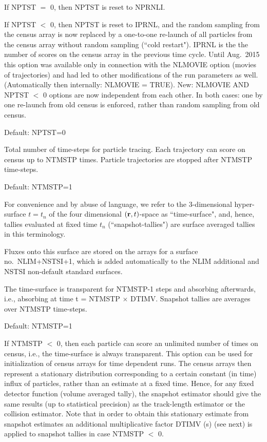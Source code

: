 \begin{description}
        If NPTST $=$ 0, then NPTST is reset to NPRNLI.

        If NPTST $<$ 0, then NPTST is reset to IPRNL, and the random sampling from the
        census array is now replaced by a one-to-one re-launch of all particles from
        the census array without random sampling (``cold restart").
        IPRNL is the the number of scores on the census array in the previous time
        cycle.
        Until Aug.\ 2015 this option was available only in connection with the NLMOVIE
        option (movies of trajectories) and had led to other modifications of the run
        parameters as well.
        (Automatically then internally: NLMOVIE = TRUE).
        New: NLMOVIE AND NPTST $<$ 0 options are now independent from each other.
        In both cases: one by one re-launch from old census is enforced, rather than
        random sampling from old census.

        Default: NPTST=0
  \item[NTMSTP] Total number of time-steps for particle tracing.
        Each trajectory can score on census up to NTMSTP times.
        Particle trajectories are stopped after NTMSTP time-steps.

        Default: NTMSTP=1

        For convenience and by abuse of language, we refer to the 3-dimensional
        hyper-surface $t=t_n$ of the four dimensional $(\mathbf{r},t)$-space as
        ``time-surface", and, hence, tallies evaluated at fixed time $t_n$
        (``snapshot-tallies") are surface averaged tallies in this terminology.

        Fluxes onto this surface are stored on the arrays for a surface no.\
        NLIM+NSTSI+1, which is added automatically to the NLIM additional and NSTSI
        non-default standard surfaces.

        The time-surface is transparent for NTMSTP-1 steps and absorbing afterwards,
        i.e., absorbing at time t = NTMSTP $\times$ DTIMV.
        Snapshot tallies are averages over NTMSTP time-steps.

        Default: NTMSTP=1

        If NTMSTP $<$ 0, then each particle can score an unlimited number of times on
        census, i.e., the time-surface is always transparent.
        This option can be used for initialization of census arrays for time dependent
        runs.
        The census arrays then represent a stationary distribution corresponding to a
        certain constant (in time) influx of particles, rather than an estimate at a
        fixed time.
        Hence, for any fixed detector function (volume averaged tally), the snapshot
        estimator should give the same results (up to statistical precision) as the
        track-length estimator or the collision estimator.
        Note that in order to obtain this stationary estimate from snapshot estimates
        an additional multiplicative factor DTIMV (\si{\second}) (see next) is applied
        to snapshot tallies in case NTMSTP $<$ 0.


\end{description}
